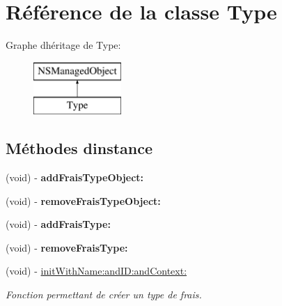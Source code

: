 \hypertarget{interface_type}{}\section{Référence de la classe Type}
\label{interface_type}
Graphe d\textquotesingle{}héritage de Type\+:\begin{figure}[H]
\begin{center}
\leavevmode
\includegraphics[height=2.000000cm]{interface_type}
\end{center}
\end{figure}
\subsection*{Méthodes d\textquotesingle{}instance}
\begin{DoxyCompactItemize}
\item 
\hypertarget{interface_type_a4cedaf21b6d42062da5c02528f242f36}{}(void) -\/ {\bfseries add\+Frais\+Type\+Object\+:}\label{interface_type_a4cedaf21b6d42062da5c02528f242f36}

\item 
\hypertarget{interface_type_a3e6ca8ffbe4d074e0d5a0017dea982b3}{}(void) -\/ {\bfseries remove\+Frais\+Type\+Object\+:}\label{interface_type_a3e6ca8ffbe4d074e0d5a0017dea982b3}

\item 
\hypertarget{interface_type_a56ba34766482e49edff2f87f00ca09f8}{}(void) -\/ {\bfseries add\+Frais\+Type\+:}\label{interface_type_a56ba34766482e49edff2f87f00ca09f8}

\item 
\hypertarget{interface_type_a9a402f4b6a35306c879847e8bf014888}{}(void) -\/ {\bfseries remove\+Frais\+Type\+:}\label{interface_type_a9a402f4b6a35306c879847e8bf014888}

\item 
(void) -\/ \hyperlink{interface_type_a59810472b23ae4965b824699c9c67805}{init\+With\+Name\+:and\+I\+D\+:and\+Context\+:}
\begin{DoxyCompactList}\small\item\em Fonction permettant de créer un type de frais. \end{DoxyCompactList}\end{DoxyCompactItemize}

